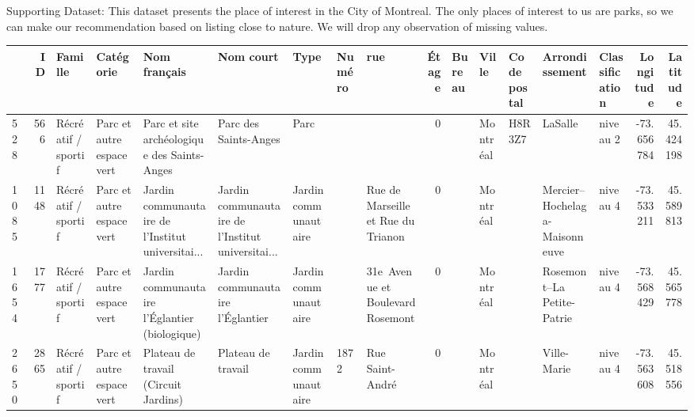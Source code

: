 \documentclass[
  ignorenonframetext,
]{beamer}
\begin{document}
\begin{frame}{Supporting Dataset:}
\protect\hypertarget{supporting-dataset}{}
This dataset presents the place of interest in the City of Montreal. The
only places of interest to us are parks, so we can make our
recommendation based on listing close to nature. We will drop any
observation of missing values.

\begin{tabular}{lrlllllllrlllllrr}
\toprule
{} &    ID &              Famille &                  Catégorie &                                       Nom français &                                          Nom court &                  Type & Numéro &                                 rue &  Étage & Bureau &     Ville & Code postal &                 Arrondissement & Classification &  Longitude &   Latitude \\
\midrule
528  &   566 &  Récréatif / sportif &  Parc et autre espace vert &        Parc et site archéologique des Saints-Anges &                              Parc des Saints-Anges &                  Parc &        &                                     &      0 &        &  Montréal &     H8R 3Z7 &                        LaSalle &       niveau 2 & -73.656784 &  45.424198 \\
1085 &  1148 &  Récréatif / sportif &  Parc et autre espace vert &  Jardin communautaire de l’Institut universitai... &  Jardin communautaire de l’Institut universitai... &  Jardin communautaire &        &  Rue de Marseille et Rue du Trianon &      0 &        &  Montréal &             &  Mercier–Hochelaga-Maisonneuve &       niveau 4 & -73.533211 &  45.589813 \\
1654 &  1777 &  Récréatif / sportif &  Parc et autre espace vert &      Jardin communautaire l’Églantier (biologique) &                   Jardin communautaire l’Églantier &  Jardin communautaire &        &    31e Avenue et Boulevard Rosemont &      0 &        &  Montréal &             &      Rosemont–La Petite-Patrie &       niveau 4 & -73.568429 &  45.565778 \\
2650 &  2865 &  Récréatif / sportif &  Parc et autre espace vert &               Plateau de travail (Circuit Jardins) &                                 Plateau de travail &  Jardin communautaire &   1872 &                     Rue Saint-André &      0 &        &  Montréal &             &                    Ville-Marie &       niveau 4 & -73.563608 &  45.518556 \\
\bottomrule
\end{tabular}


\end{frame}
\end{document}
